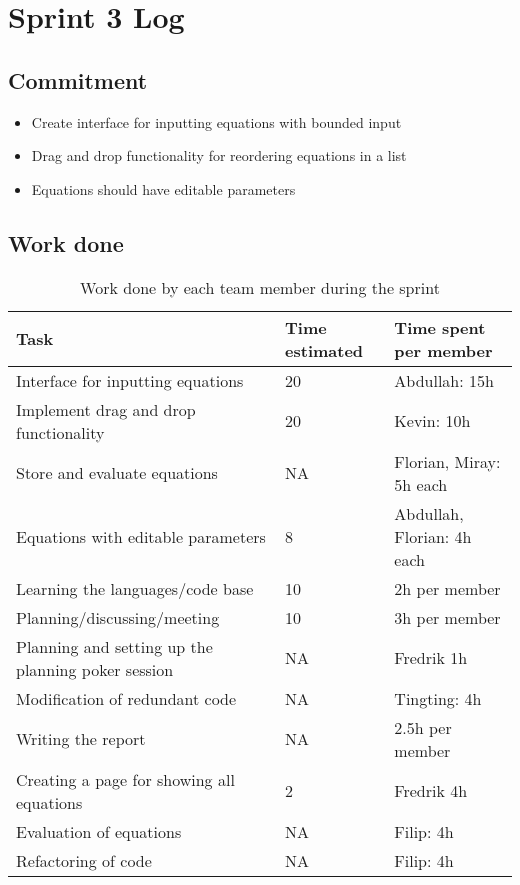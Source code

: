 \documentclass[14]{article}
\begin{document}
\section{Sprint 3 Log}

\subsection{Commitment}

\begin{itemize}
    \item Create interface for inputting equations with bounded input
    \item Drag and drop functionality for reordering equations in a list
    \item Equations should have editable parameters
\end{itemize}

\subsection{Work done}

\begin{table}[H]
    \centering
    \begin{tabular}{|p{}|l|p{}|}
        \hline
        \textbf{Task} & \textbf{Time estimated} & \textbf{Time spent per member}  \\
        \hline
        Interface for inputting equations & 20 & Abdullah: 15h  \\
        \hline
        Implement drag and drop functionality & 20 & Kevin: 10h \\
        \hline
        Store and evaluate equations & NA & Florian, Miray: 5h each\\
        \hline        
        Equations with editable parameters & 8 & Abdullah, Florian: 4h each \\
        \hline        
        Learning the languages/code base & 10 & 2h per member \\
        \hline        
        Planning/discussing/meeting & 10 & 3h per member \\
        \hline        
        Planning and setting up the planning poker session & NA & Fredrik 1h \\
        \hline        
        Modification of redundant code & NA & Tingting: 4h \\
        \hline        
        Writing the report & NA & 2.5h per member \\
        \hline        
        Creating a page for showing all equations & 2 & Fredrik 4h \\
        \hline        
        Evaluation of equations & NA & Filip: 4h \\
        \hline        
        Refactoring of code & NA & Filip: 4h \\
        \hline
        
    \end{tabular}
    \caption{Work done by each team member during the sprint}
    \label{tab:my_label}
\end{table}
\end{document}
